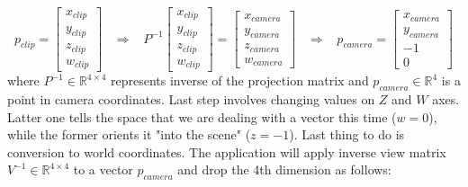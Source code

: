 \documentclass{report}
\begin{document}
\begin{equation} \label{eq:to_camera}
p_{clip} = \begin{bmatrix}
           x_{clip}\\
           y_{clip} \\
           z_{clip} \\
           w_{clip}
\end{bmatrix} \; \; \; \Rightarrow \; \; \; 
P^{-1}\begin{bmatrix}
           x_{clip}\\
           y_{clip} \\
           z_{clip} \\
           w_{clip}
\end{bmatrix} = \begin{bmatrix}
           x_{camera}\\
           y_{camera} \\
           z_{camera} \\
           w_{camera}
\end{bmatrix}  \; \; \; \Rightarrow \; \; \; 
p_{camera} = \begin{bmatrix}
           x_{camera}\\
           y_{camera} \\
           -1 \\
           0
\end{bmatrix}
\end{equation}
where $P^{-1} \in \mathbb{R}^{4 \times 4}$ represents inverse of the projection matrix and $p_{camera} \in \mathbb{R}^{4}$ is a point in camera coordinates. Last step involves changing values on $Z$ and $W$ axes. Latter one tells the space that we are dealing with a vector this time ($w = 0$), while the former orients it "into the scene" ($z=-1$). Last thing to do is conversion to world coordinates. The application will apply inverse view matrix  $V^{-1} \in \mathbb{R}^{4 \times 4}$ to a vector $p_{camera}$ and drop the 4th dimension as follows:
\end{document}
